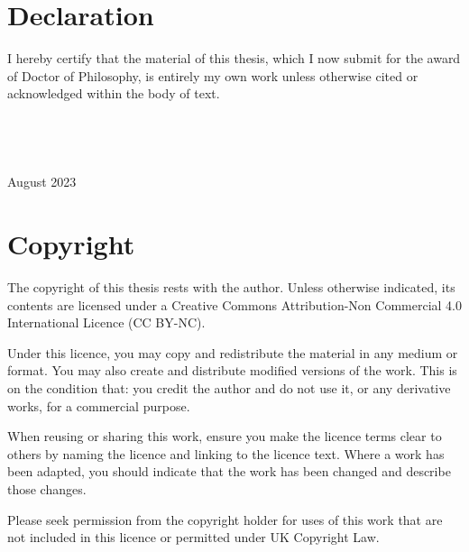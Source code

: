 \chapter*{Declaration}

I hereby certify that the material of this thesis, which I now submit for the award of Doctor of Philosophy, is entirely my own work unless otherwise cited or acknowledged within the body of text.
\\
\\
\\
\\
 \\
August 2023

\begingroup
\let\clearpage\relax
\chapter*{Copyright}
The copyright of this thesis rests with the author. Unless otherwise indicated, its contents are licensed under a Creative Commons Attribution-Non Commercial 4.0 International Licence (CC BY-NC). 

Under this licence, you may copy and redistribute the material in any medium or format. You may also create and distribute modified versions of the work. This is on the condition that: you credit the author and do not use it, or any derivative works, for a commercial purpose.

When reusing or sharing this work, ensure you make the licence terms clear to others by naming the licence and linking to the licence text. Where a work has been adapted, you should indicate that the work has been changed and describe those changes. 

Please seek permission from the copyright holder for uses of this work that are not included in this licence or permitted under UK Copyright Law.

\endgroup